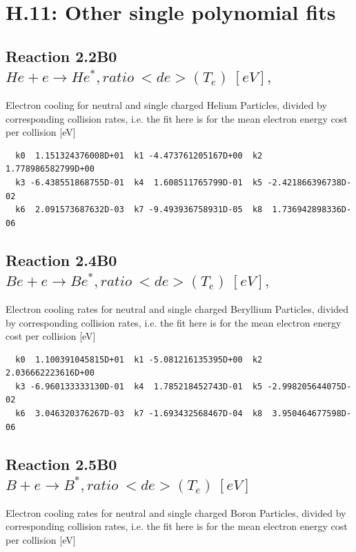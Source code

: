 \documentclass[12pt,dvips]{article}
\begin{document}
\section{H.11: Other single polynomial fits}

\subsection{
Reaction 2.2B0   $ He + e  \rightarrow He^*,  ratio  \ <de>(T_e) \ [eV], $
}

  Electron cooling for neutral and single
  charged Helium Particles, divided by corresponding collision rates, i.e. the fit here is for the mean electron energy cost per collision [eV]

\begin{small}\begin{verbatim}
  k0  1.151324376008D+01  k1 -4.473761205167D+00  k2  1.778986582799D+00
  k3 -6.438551868755D-01  k4  1.608511765799D-01  k5 -2.421866396738D-02
  k6  2.091573687632D-03  k7 -9.493936758931D-05  k8  1.736942898336D-06

\end{verbatim}\end{small}


\subsection{
Reaction 2.4B0  $   Be + e \rightarrow Be^*,  ratio \ <de>(T_e)  \ [eV],$
}

  Electron cooling rates for neutral and single
  charged Beryllium Particles, divided by corresponding collision rates, i.e. the fit here is for the mean electron energy cost per collision [eV]

\begin{small}\begin{verbatim}
  k0  1.100391045815D+01  k1 -5.081216135395D+00  k2  2.036662223616D+00
  k3 -6.960133333130D-01  k4  1.785218452743D-01  k5 -2.998205644075D-02
  k6  3.046320376267D-03  k7 -1.693432568467D-04  k8  3.950464677598D-06

\end{verbatim}\end{small}
\subsection{
Reaction 2.5B0   $  B + e \rightarrow B^*, ratio \ <de>(T_e) \ [eV] $
}

 Electron cooling rates for neutral and single
 charged Boron Particles, divided by corresponding collision rates, i.e. the fit here is for the mean electron energy cost per collision [eV]
\end{document}
